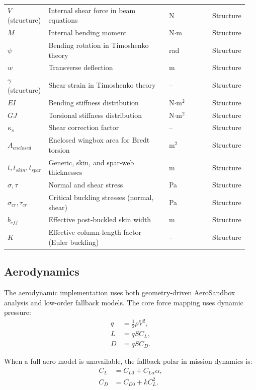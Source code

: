 ﻿\documentclass[11pt]{article}
\begin{document}
\begin{longtable}{p{0.15\linewidth} p{0.50\linewidth} p{0.18\linewidth} p{0.12\linewidth}}
\(V\) (structure) & Internal shear force in beam equations & N & Structure \\
\(M\) & Internal bending moment & N\(\cdot\)m & Structure \\
\(\psi\) & Bending rotation in Timoshenko theory & rad & Structure \\
\(w\) & Transverse deflection & m & Structure \\
\(\gamma\) (structure) & Shear strain in Timoshenko theory & -- & Structure \\
\(EI\) & Bending stiffness distribution & N\(\cdot\)m\(^2\) & Structure \\
\(GJ\) & Torsional stiffness distribution & N\(\cdot\)m\(^2\) & Structure \\
\(\kappa_s\) & Shear correction factor & -- & Structure \\
\(A_{enclosed}\) & Enclosed wingbox area for Bredt torsion & m\(^2\) & Structure \\
\(t, t_{skin}, t_{spar}\) & Generic, skin, and spar-web thicknesses & m & Structure \\
\(\sigma, \tau\) & Normal and shear stress & Pa & Structure \\
\(\sigma_{cr}, \tau_{cr}\) & Critical buckling stresses (normal, shear) & Pa & Structure \\
\(b_{eff}\) & Effective post-buckled skin width & m & Structure \\
\(K\) & Effective column-length factor (Euler buckling) & -- & Structure \\
\bottomrule
\end{longtable}

\subsection{Aerodynamics}
The aerodynamic implementation uses both geometry-driven AeroSandbox analysis and low-order fallback models.
The core force mapping uses dynamic pressure:
\begin{align}
q &= \tfrac{1}{2}\rho V^2, \\
L &= q S C_L, \\
D &= q S C_D.
\end{align}

When a full aero model is unavailable, the fallback polar in mission dynamics is:
\begin{align}
C_L &= C_{L0} + C_{L\alpha}\alpha, \\
C_D &= C_{D0} + k C_L^2.
\end{align}
\end{document}
